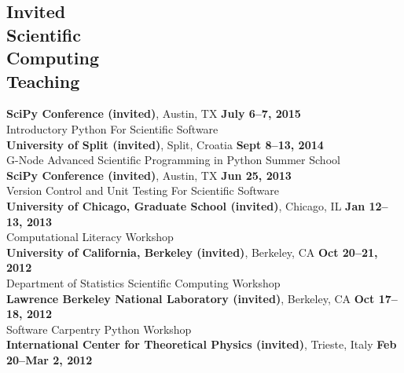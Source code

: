 \documentclass[margin,line]{resume}
\begin{document}
\begin{resume}
    \section{\mysidestyle Invited\\Scientific\\Computing\\Teaching}
    \textbf{SciPy Conference (invited)}, Austin, TX \hfill \textbf{July 6--7, 2015}\\
    Introductory Python For Scientific Software
               \vspace{2mm}\\
    \textbf{University of Split (invited)}, Split, Croatia \hfill \textbf{Sept 8--13, 2014}\\
    G-Node Advanced Scientific Programming in Python Summer School
               \vspace{2mm}\\
    \textbf{SciPy Conference (invited)}, Austin, TX \hfill \textbf{Jun 25, 2013}\\
    Version Control and Unit Testing For Scientific Software
               \vspace{2mm}\\
    \textbf{University of Chicago, Graduate School (invited)}, Chicago, IL \hfill \textbf{Jan 12--13, 2013}\\
    Computational Literacy Workshop
               \vspace{2mm}\\
    \textbf{University of California, Berkeley (invited)}, Berkeley, CA \hfill \textbf{Oct 20--21, 2012}\\
    Department of Statistics Scientific Computing Workshop
               \vspace{2mm}\\
    \textbf{Lawrence Berkeley National Laboratory (invited)}, Berkeley, CA \hfill \textbf{Oct 17--18, 2012}\\
    Software Carpentry Python Workshop
               \vspace{2mm}\\
    \textbf{International Center for Theoretical Physics (invited)}, Trieste, Italy \hfill \textbf{Feb 20--Mar 2, 2012}\\

\end{resume}
\end{document}
